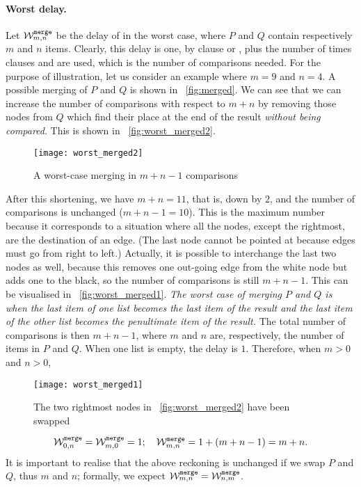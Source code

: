 \medskip

\paragraph{Worst delay.}

Let \(\worst{merge}{m,n}\) be the delay of
 in the worst case, where \(P\) and \(Q\)
contain respectively \(m\) and \(n\) items. Clearly, this delay is
one, by clause \clause{\alpha} or \clause{\beta}, plus the number of
times clauses \clause{\gamma} and \clause{\delta} are used, which is
the number of comparisons needed. For the purpose of illustration, let
us consider an example where \(m=9\) and \(n=4\). A possible merging
of \(P\) and \(Q\) is shown in \fig~\vref{fig:merged}. We can see that
we can increase the number of comparisons with respect to \(m+n\) by
removing those nodes from \(Q\) which find their place at the end of
the result \emph{without being compared}. This is shown in
\fig~\vref{fig:worst_merged2}.
\begin{figure}[t]
\centering
\texttt{[image: worst\_merged2]}
\caption{A worst\hyp{}case merging in \(m+n-1\)
  comparisons\label{fig:worst_merged2}}
\end{figure}
After this shortening, we have \(m+n=11\), that is, down by \(2\), and
the number of comparisons is unchanged (\(m+n-1=10\)). This is the
maximum number because it corresponds to a situation where all the
nodes, except the rightmost, are the destination of an edge. (The last
node cannot be pointed at because edges must go from right to left.)
Actually, it is possible to interchange the last two nodes as well,
because this removes one out\hyp{}going edge from the white node but
adds one to the black, so the number of comparisons is still
\(m+n-1\). This can be visualised in \fig~\vref{fig:worst_merged1}.
\emph{The worst case of merging \(P\) and \(Q\) is when the last item
  of one list becomes the last item of the result and the last item of
  the other list becomes the penultimate item of the result.} The
total number of comparisons is then \(m+n-1\), where \(m\) and \(n\)
are, respectively, the number of items in \(P\) and \(Q\). When one
list is empty, the delay is \(1\). Therefore, when \(m > 0\) and \(n >
0\),
\begin{figure}[b]
\centering
\texttt{[image: worst\_merged1]}
\caption{The two rightmost nodes in \fig~\vref{fig:worst_merged2} have
  been swapped\label{fig:worst_merged1}}
\end{figure}
\begin{equation}
\worst{merge}{0,n} = \worst{merge}{m,0} = 1;\quad
\worst{merge}{m,n} = 1 + (m + n - 1) = m + n.\label{eq:worst_merge}
\end{equation}
It is important to realise that the above reckoning is unchanged if we
swap \(P\) and \(Q\), thus \(m\) and \(n\); formally, we expect
\(\worst{merge}{m,n} = \worst{merge}{n,m}\).

